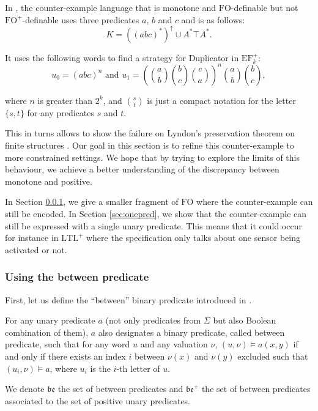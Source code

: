 \documentclass[a4paper,UKenglish,cleveref, autoref, thm-restate]{lipics-v2021}
\newcommand{\FO}{\mathrm{FO}}
\newcommand{\FOp}{\FO^+}
\newcommand{\LTL}{\mathrm{LTL}}
\newcommand{\LTLp}{\LTL^+}
\newcommand{\EF}{\mathrm{EF}}
\newcommand{\be}{\mathfrak{be}}
\newcommand{\val}{\nu}
\begin{document}
In \cite{PFO}, the counter-example language that is monotone and $\FO$-definable but not $\FOp$-definable uses three predicates $a$, $b$ and $c$ and is as follows:
$$
K = ((abc)^*)^{\uparrow} \cup A^* \top A^*.
$$

It uses the following words to find a strategy for Duplicator in $\EF_k^+$:
$$
u_0 = (abc)^n
\text{ and }
u_1 = \left(\binom{a}{b}\binom{b}{c}\binom{c}{a}\right)^n \binom{a}{b} \binom{b}{c},
$$

where $n$ is greater than $2^k$, and $\binom{s}{t}$ is just a compact notation for the letter $\{s,t\}$ for any predicates $s$ and $t$.

This in turns allows to show the failure on Lyndon's preservation theorem on finite structures \cite{PFO}.
Our goal in this section is to refine this counter-example to more constrained settings. We hope that by trying to explore the limits of this behaviour, we achieve a better understanding of the discrepancy between monotone and positive.

In Section \ref{sec:between}, we give a smaller fragment of $\FO$ where the counter-example can still be encoded.
In Section \ref{sec:onepred}, we show that the counter-example can still be expressed with a single unary predicate. This means that it could occur for instance in $\LTLp$ where the specification only talks about one sensor being activated or not.

\subsubsection{Using the between predicate}\label{sec:between}

First, let us define the ``between'' binary predicate introduced in \cite{between}.

\begin{definition}\cite{between}
    For any unary predicate $a$ (not only predicates from $\Sigma$ but also Boolean combination of them), $a$ also designates a binary predicate, called between predicate, such that for any word $u$ and any valuation $\val$, $(u,\val) \models a(x,y)$ if and only if there exists an index $i$ between $\val(x)$ and $\val(y)$ excluded such that $(u_i,\val) \models a$, where $u_i$ is the $i$-th letter of $u$.

    We denote $\be$ the set of between predicates and $\be^+$ the set of between predicates associated to the set of positive unary predicates.
\end{definition}
\end{document}
